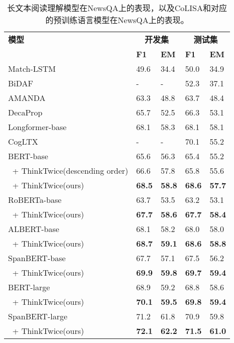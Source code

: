 \begin{table}[htbp]
    \centering
    \caption{长文本阅读理解模型在NewsQA上的表现，以及CoLISA和对应的预训练语言模型在NewsQA上的表现。}
    \begin{tabular}{lp{24pt}<{\centering}p{24pt}<{\centering}p{24pt}<{\centering}p{24pt}<{\centering}}
         \hline
         {\bfseries 模型} & \multicolumn{2}{c}{\bfseries 开发集} & \multicolumn{2}{c}{\bfseries 测试集} \\
         & {\bfseries F1} & {\bfseries EM} & {\bfseries F1} & {\bfseries EM} \\
         \hline
         Match-LSTM~\cite{wang2015learning} & 49.6 & 34.4 & 50.0 & 34.9 \\
         BiDAF~\cite{seo2016bidirectional} & - & - & 52.3 & 37.1 \\
         AMANDA~\cite{kundu2018question} & 63.3 & 48.8 & 63.7 & 48.4 \\
         DecaProp~\cite{tay2018densely} & 65.7 & 52.5 & 66.3 & 53.1 \\
         Longformer-base~\cite{beltagy2020longformer} & 68.1 & 58.3 & 68.1 & 58.1 \\
         CogLTX~\cite{ding2020cogltx} & - & - & 70.1 & 55.2 \\
         \hline
         \hline
         BERT-base~\cite{devlin2018bert} & 65.6 & 56.3 & 65.4 & 55.2 \\
         $\ $ + ThinkTwice(descending order) & 66.6 & 57.8 & 65.8 & 55.6 \\
         $\ $ + ThinkTwice(ours) & {\bfseries 68.5} & {\bfseries58.8} & {\bfseries68.6} & {\bfseries57.7} \\
         \hline
         RoBERTa-base~\cite{liu2019roberta} & 63.7 & 53.5 & 63.2 & 53.1 \\
         $\ $ + ThinkTwice(ours) & {\bfseries67.7} & {\bfseries58.6} & {\bfseries67.7} & {\bfseries58.4} \\
         \hline
         ALBERT-base~\cite{lan2019albert} & 68.1 & 58.2 & 68.0 & 58.0 \\
         $\ $ + ThinkTwice(ours) & {\bfseries68.7} & {\bfseries59.1} & {\bfseries68.6} & {\bfseries58.8} \\
         \hline
         SpanBERT-base~\cite{joshi2020spanbert} & 67.7 & 57.1 & 67.5 & 56.2 \\
         $\ $ + ThinkTwice(ours) & {\bfseries69.9} & {\bfseries59.8} & {\bfseries69.7} & {\bfseries59.4} \\
         \hline
         BERT-large & 68.9 & 59.2 & 68.8 & 58.6 \\
         $\ $ + ThinkTwice(ours) & {\bfseries70.1} & {\bfseries59.5} & {\bfseries69.8} & {\bfseries59.4} \\
         \hline
         SpanBERT-large & 71.2 & 61.8 & 70.9 & 59.8 \\
         $\ $ + ThinkTwice(ours) & {\bfseries72.1} & {\bfseries62.2} & {\bfseries71.5} & {\bfseries61.0} \\
         \hline
    \end{tabular}
    \label{tab:3-1}
\end{table}
